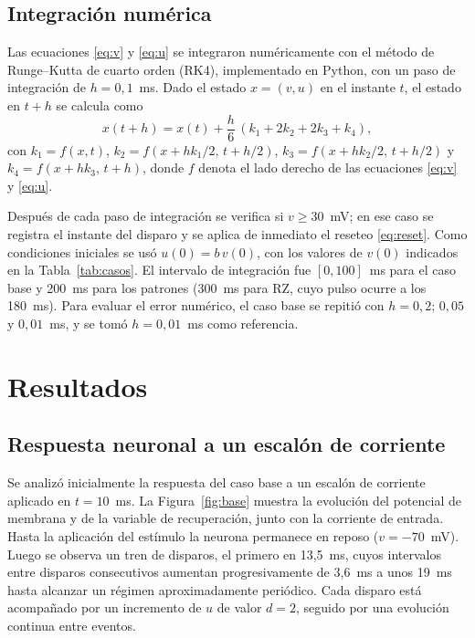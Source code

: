 \documentclass[10pt,a4paper,twocolumn]{article}
\begin{document}
\subsection*{Integración numérica}

Las ecuaciones \eqref{eq:v} y \eqref{eq:u} se integraron numéricamente con el método
de Runge--Kutta de cuarto orden (RK4), implementado en Python, con un paso de
integración de $h = 0,1$~ms. Dado el estado $x = (v, u)$ en el instante $t$, el
estado en $t + h$ se calcula como
\begin{equation}
  x(t + h) = x(t) + \frac{h}{6}\,(k_{1} + 2k_{2} + 2k_{3} + k_{4}),
\end{equation}
con $k_1 = f(x, t)$, $k_2 = f(x + h k_1/2,\, t + h/2)$,
$k_3 = f(x + h k_2/2,\, t + h/2)$ y $k_4 = f(x + h k_3,\, t + h)$, donde $f$ denota el
lado derecho de las ecuaciones \eqref{eq:v} y \eqref{eq:u}.

Después de cada paso de integración se verifica si $v \geq 30$~mV; en ese caso se
registra el instante del disparo y se aplica de inmediato el reseteo
\eqref{eq:reset}. Como condiciones iniciales se usó $u(0) = b\,v(0)$, con los valores
de $v(0)$ indicados en la Tabla~\ref{tab:casos}. El intervalo de integración fue
$[0, 100]$~ms para el caso base y 200~ms para los patrones (300~ms para RZ, cuyo
pulso ocurre a los 180~ms). Para evaluar el error numérico, el caso base se repitió
con $h = 0,2$; $0,05$ y $0,01$~ms, y se tomó $h = 0,01$~ms como referencia.

\section{Resultados}

\subsection*{Respuesta neuronal a un escalón de corriente}

Se analizó inicialmente la respuesta del caso base a un escalón de corriente aplicado
en $t = 10$~ms. La Figura~\ref{fig:base} muestra la evolución del potencial de
membrana y de la variable de recuperación, junto con la corriente de entrada. Hasta
la aplicación del estímulo la neurona permanece en reposo ($v = -70$~mV). Luego se
observa un tren de disparos, el primero en 13,5~ms, cuyos intervalos entre disparos
consecutivos aumentan progresivamente de 3,6~ms a unos 19~ms hasta alcanzar un
régimen aproximadamente periódico. Cada disparo está acompañado por un incremento de
$u$ de valor $d = 2$, seguido por una evolución continua entre eventos.
\end{document}
